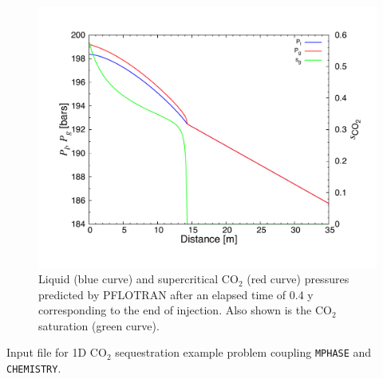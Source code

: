 \begin{figure}[t]\centering
\includegraphics[width=\textwidth]{./figs/p}

\vspace{-1.cm}

\parbox{5in}{
\caption{Liquid (blue curve) and supercritical CO$_2$ (red curve) pressures predicted by PFLOTRAN after an elapsed time of 0.4 y corresponding to the end of injection. Also shown is the CO$_2$ saturation (green curve).}
\label{fp}}
\end{figure}


\newpage

\begin{table}[h]
\caption{Input file for 1D CO$_2$ sequestration example problem coupling {\tt MPHASE} and {\tt CHEMISTRY}.}
\end{table}
\footnotesize
{}\label{tco2in}
\normalsize

\newpage
